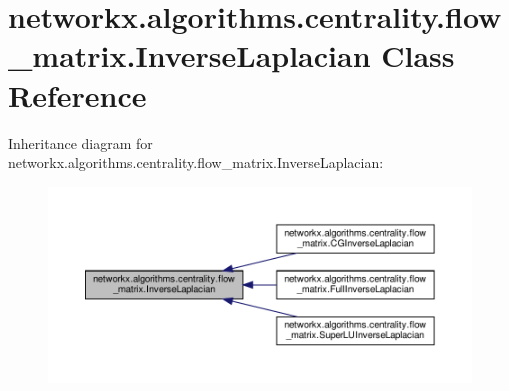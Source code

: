 \hypertarget{classnetworkx_1_1algorithms_1_1centrality_1_1flow__matrix_1_1InverseLaplacian}{}\section{networkx.\+algorithms.\+centrality.\+flow\+\_\+matrix.\+Inverse\+Laplacian Class Reference}
\label{classnetworkx_1_1algorithms_1_1centrality_1_1flow__matrix_1_1InverseLaplacian}


Inheritance diagram for networkx.\+algorithms.\+centrality.\+flow\+\_\+matrix.\+Inverse\+Laplacian\+:
\nopagebreak
\begin{figure}[H]
\begin{center}
\leavevmode
\includegraphics[width=350pt]{classnetworkx_1_1algorithms_1_1centrality_1_1flow__matrix_1_1InverseLaplacian__inherit__graph}
\end{center}
\end{figure}
